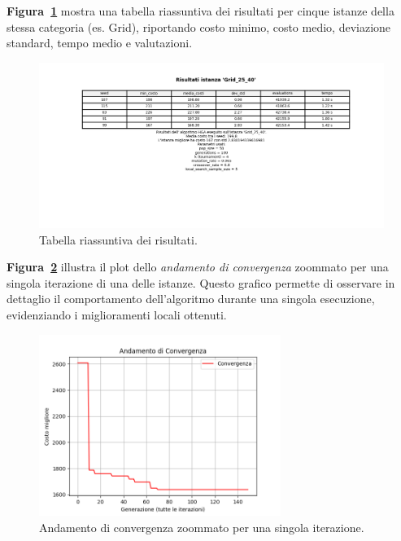 \documentclass[a4paper,12pt]{article}
\begin{document}
\bigskip

\textbf{Figura~\ref{fig:tabella}} mostra una tabella riassuntiva dei risultati per cinque istanze della stessa categoria (es. Grid), riportando costo minimo, costo medio, deviazione standard, tempo medio e valutazioni.

\begin{figure}[H]
    \centering
    \includegraphics[width=1\textwidth]{res/tab_sample.png}
    \caption{Tabella riassuntiva dei risultati.}
    \label{fig:tabella}
\end{figure}

\bigskip

\textbf{Figura~\ref{fig:zoomConvergence}} illustra il plot dello \emph{andamento di convergenza} zoommato per una singola iterazione di una delle istanze. Questo grafico permette di osservare in dettaglio il comportamento dell'algoritmo durante una singola esecuzione, evidenziando i miglioramenti locali ottenuti.

\begin{figure}[H]
    \centering
    \includegraphics[width=0.7\textwidth]{res/best_interation2.png}
    \caption{Andamento di convergenza zoommato per una singola iterazione.}
    \label{fig:zoomConvergence}
\end{figure}
\end{document}
